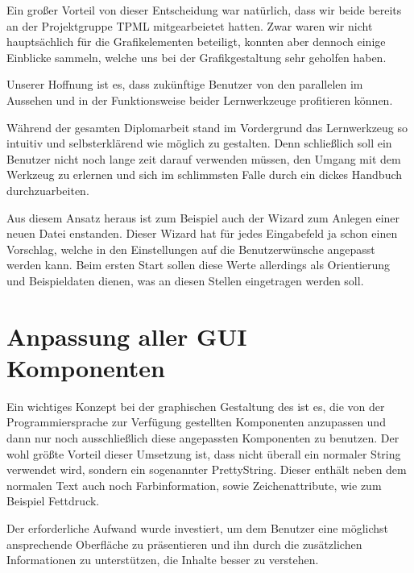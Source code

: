 Ein großer Vorteil von dieser Entscheidung war natürlich, dass wir beide
bereits an der Projektgruppe TPML mitgearbeietet hatten. Zwar waren wir nicht
hauptsächlich für die Grafikelementen beteiligt, konnten aber dennoch einige
Einblicke sammeln, welche uns bei der Grafikgestaltung sehr geholfen
haben.\vspace{10pt}

Unserer Hoffnung ist es, dass zukünftige Benutzer von den parallelen im Aussehen
und in der Funktionsweise beider Lernwerkzeuge profitieren können.\vspace{10pt}

Während der gesamten Diplomarbeit stand im Vordergrund das Lernwerkzeug so
intuitiv und selbsterklärend wie möglich zu gestalten. Denn schließlich soll
ein Benutzer nicht noch lange zeit darauf verwenden müssen, den Umgang mit dem
Werkzeug zu erlernen und sich im schlimmsten Falle durch ein dickes Handbuch
durchzuarbeiten.\vspace{10pt}

Aus diesem Ansatz heraus ist zum Beispiel auch der Wizard zum Anlegen einer
neuen Datei enstanden. Dieser Wizard hat für jedes Eingabefeld ja schon einen
Vorschlag, welche in den Einstellungen auf die Benutzerwünsche angepasst werden
kann. Beim ersten Start sollen diese Werte allerdings als Orientierung und
Beispieldaten dienen, was an diesen Stellen eingetragen werden soll. 


\section{Anpassung aller GUI Komponenten}

Ein wichtiges Konzept bei der graphischen Gestaltung des \gtitool ist es, die von
der Programmiersprache zur Verfügung gestellten Komponenten anzupassen und dann
nur noch ausschließlich diese angepassten Komponenten zu benutzen. Der wohl
größte Vorteil dieser Umsetzung ist, dass nicht überall ein normaler String
verwendet wird, sondern ein sogenannter PrettyString. Dieser enthält neben dem
normalen Text auch noch Farbinformation, sowie Zeichenattribute, wie zum
Beispiel Fettdruck.\vspace{10pt}

Der erforderliche Aufwand wurde investiert, um dem Benutzer eine möglichst
ansprechende Oberfläche zu präsentieren und ihn durch die zusätzlichen
Informationen zu unterstützen, die Inhalte besser zu verstehen.\vspace{10pt}

